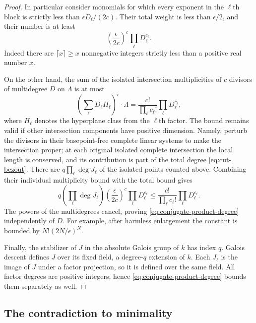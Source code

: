 \begin{proof}
In particular consider monomials for which every exponent in the
$\ell$th block is strictly less than $\epsilon D_\ell/(2c)$.
Their total weight is less than $\epsilon/2$, and their number is
at least
\begin{equation}\label{eq:cut-local-multiplicity}
 \left(\frac{\epsilon}{2c}\right)^c
       \prod_\ell D_\ell^{c_\ell}.
\end{equation}
Indeed there are $\lceil x\rceil\ge x$ nonnegative integers
strictly less than a positive real number $x$.

On the other hand, the sum of the isolated intersection
multiplicities of $c$ divisors of multidegree $D$ on $\Lambda$ is
at most
\begin{equation}\label{eq:cut-bezout}
 \left(\sum_\ell D_\ell H_\ell\right)^c\cdot\Lambda
 =\frac{c!}{\prod_\ell c_\ell!}\prod_\ell D_\ell^{c_\ell},
\end{equation}
where $H_\ell$ denotes the hyperplane class from the $\ell$th
factor.  The bound remains valid if other intersection components
have positive dimension.  Namely, perturb the divisors in their
basepoint-free complete linear systems to make the intersection
proper; at each original isolated complete intersection the local
length is conserved, and its contribution is part of the total
degree \eqref{eq:cut-bezout}.  There are
$q\prod_\ell\deg J_\ell$ of the isolated points counted above.
Combining their individual multiplicity bound with the total bound gives
\[
 q\left(\prod_\ell\deg J_\ell\right)
   \left(\frac{\epsilon}{2c}\right)^c
   \prod_\ell D_\ell^{c_\ell}
 \le \frac{c!}{\prod_\ell c_\ell!}
       \prod_\ell D_\ell^{c_\ell}.
\]
The powers of the multidegrees cancel, proving
\eqref{eq:conjugate-product-degree} independently of $D$.
For example, after harmless enlargement the constant is bounded by
$N!(2N/\epsilon)^N$.

Finally, the stabilizer of $J$ in the absolute Galois group of $k$
has index $q$.  Galois descent defines $J$ over its fixed field,
a degree-$q$ extension of $k$.  Each $J_\ell$ is the image of $J$
under a factor projection, so it is defined over the same field.
All factor degrees are positive integers; hence
\eqref{eq:conjugate-product-degree} bounds them separately as well.
\end{proof}

\subsection{The contradiction to minimality}

